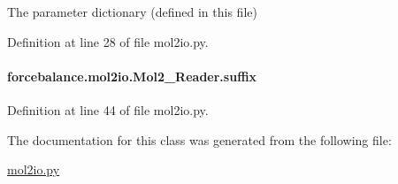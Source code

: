 The parameter dictionary (defined in this file) 



Definition at line 28 of file mol2io.\-py.

\hypertarget{classforcebalance_1_1mol2io_1_1Mol2__Reader_a3c5f0f93848a5d83a50facb1d01fe3b1}{
\paragraph[{suffix}]{\setlength{\rightskip}{0pt plus 5cm}forcebalance.\-mol2io.\-Mol2\-\_\-\-Reader.\-suffix}}\label{classforcebalance_1_1mol2io_1_1Mol2__Reader_a3c5f0f93848a5d83a50facb1d01fe3b1}


Definition at line 44 of file mol2io.\-py.



The documentation for this class was generated from the following file\-:\begin{DoxyCompactItemize}
\item 
\hyperlink{mol2io_8py}{mol2io.\-py}\end{DoxyCompactItemize}
